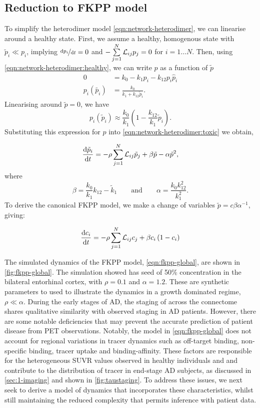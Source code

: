 \subsection{Reduction to FKPP model}
\label{sec:model-reduction-fkpp}
To simplify the heterodimer model \cref{eqn:network-heterodimer}, we can
linearise around a healthy state. First, we assume a healthy, homogenous state
with $\tilde{p}_i \ll p_i$, implying $\nicefrac{\mathrm{d}p_i}{\mathrm{d}t} = 0$ and
$-\sum\limits_{j=1}^{N}\mathcal{L}_{ij} p_j = 0$ for $i = 1 \hdots N$. Then, using 
\cref{eqn:network-heterodimer:healthy}, we can write $p$ as a function of
$\tilde{p}$
\begin{align*}
    0 &= k_0 - k_1 p_i - k_{12}p_i \hat{p}_i \\ 
    p_i(\tilde{p_i}) &= \frac{k_0}{k_1 + k_{12}\tilde{p}_i}.
\end{align*}
Linearising around $\tilde{p} = 0$, we have 
\[
    p_i(\tilde{p}_i) \approx \frac{k_0}{k_1}\left(1-\frac{k_{12}}{k_1}\tilde{p}_i\right).    
\]
Substituting this expression for $p$ into
\cref{eqn:network-heterodimer:toxic} we obtain, 

\begin{equation}\label{eqn:fkpp-goriely}
    \dfrac{\mathrm{d}\tilde{p}_i}{\mathrm{d}t} = - \rho \sum\limits_{j=1}^{N}\mathcal{L}_{ij} \tilde{p}_j  
                        + \beta \tilde{p} 
                         -\alpha\tilde{p}^2,
\end{equation}
where 
\begin{equation}
    \beta = \frac{k_0}{k_1}k_{12} - \tilde{k}_{1} 
    \qquad \text{and} \qquad 
    \alpha = \frac{k_0 k_{12}^2}{k_1^2}.
\end{equation}
To derive the canonical FKPP model, we make a change of variables
$\tilde{p} = c \beta\alpha^{-1}$, giving: 

\begin{equation}
    \label{eqn:fkpp-global}
    \dfrac{\mathrm{d}c_i}{\mathrm{d}t} = - \rho \sum\limits_{j=1}^{N}\mathcal{L}_{ij} c_j + \beta c_i \left( 1 - c_i \right)     
\end{equation}

The simulated dynamics of the FKPP model, \cref{eqn:fkpp-global}, are shown in
\cref{fig:fkpp-global}. The simulation showed has \TP seed of 50\% concentration
in the bilateral entorhinal cortex, with $\rho = 0.1$ and $\alpha = 1.2$. These
are synthetic parameters to used to illustrate the dynamics in a growth
dominated regime, $\rho \ll \alpha$. During the early stages of AD, the staging
of \TP across the connectome shares qualitative similarity with observed staging
in AD patients. However, there are some notable deficiencies that may prevent
the accurate prediction of patient disease from \TP PET observations. Notably,
the model in \cref{eqn:fkpp-global} does not account for regional variations in
tracer dynamics such as off-target binding, non-specific binding, tracer uptake
and binding-affinity. These factors are responsible for the heterogeneous SUVR
values observed in healthy individuals and and contribute to the distribution of
\TP tracer in end-stage AD subjects, as discussed in \cref{sec:1-imaging} and 
shown in \cref{fig:taustaging}. To address these issues, we next seek to
derive a model of \TP dynamics that incorporates these characteristics, whilst
still maintaining the reduced complexity that permits inference with patient
data.

